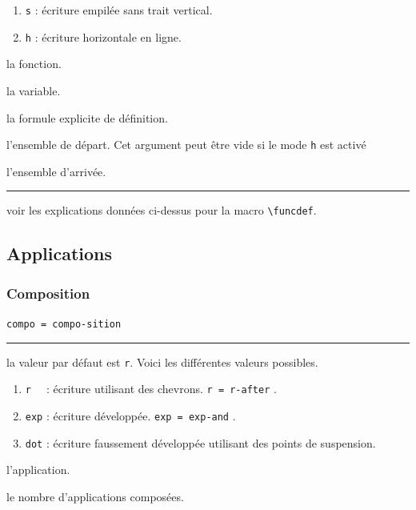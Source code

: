 \documentclass[12pt,a4paper]{book}
\newcommand\env[1]{\texttt{#1}}
\newcommand\macro[1]{\env{\textbackslash{}#1}}
\theoremstyle{definition}
\newcommand\separation{
	\medskip
	\hfill\rule{0.5\textwidth}{0.75pt}\hfill
	\medskip
}
\newcommand\extraspace{
	\vspace{0.25em}
}
\newcommand\mwhyprefix[2]{%
	\texttt{#1 = #1-#2}%
}
\begin{document}
{{\begin{enumerate}
	\item \verb+s+ : écriture empilée sans trait vertical.

	\item \verb+h+ : écriture horizontale en ligne.
\end{enumerate}


 la fonction.

 la variable.

 la formule explicite de définition.

 l'ensemble de départ. Cet argument peut être vide si le mode \verb+h+ est activé

 l'ensemble d'arrivée.


\separation




 voir les explications données ci-dessus pour la macro \macro{funcdef}.


\subsection{Applications}

\subsubsection{Composition}



  \hfill \mwhyprefix{compo}{sition}


\separation


\IDoption{} la valeur par défaut est \verb+r+. 
            Voici les différentes valeurs possibles.
\begin{enumerate}
	\item \verb+r  + : écriture utilisant des chevrons.  \hfill \mwhyprefix{r}{after}.

	\extraspace 
	
	\item \verb+exp+ : écriture développée.  \hfill \mwhyprefix{exp}{and}.

	\item \verb+dot+ : écriture faussement développée utilisant des points de suspension.
\end{enumerate}

 l'application.

 le nombre d'applications composées.


}}
\end{document}
